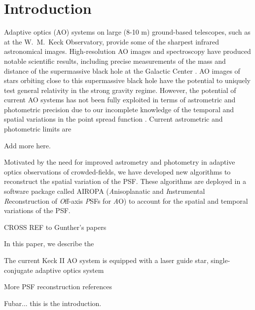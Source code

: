 \section{Introduction}

Adaptive optics (AO) systems on large (8-10 m)
ground-based telescopes, such as at the W.~M.~Keck Observatory,
provide some of the sharpest infrared astronomical images. 
High-resolution AO images and spectroscopy have produced 
notable scientific results, including precise measurements of the mass
and distance of the supermassive black hole at the Galactic Center \cite{Ghez:2008}. 
AO images of stars orbiting close to this supermassive black
hole have the potential to uniquely test general relativity in the strong
gravity regime. However, the potential of current AO systems has not been
fully exploited in terms of astrometric and photometric precision due
to our incomplete knowledge of the temporal and spatial variations in
the point spread function \cite[PSF][]{Davies:2012,Lu:2014}. 
Current astrometric and photometric limits are 
\begin{notes}
Add more here.
\end{notes}

Motivated by the need for improved astrometry and photometry in
adaptive optics observations of crowded-fields, we have developed new
algorithms to reconstruct the spatial variation of the PSF. 
These algorithms are deployed in a software package called
 AIROPA ({\it A}nisoplanatic and {\it I}nstrumental {\it
  R}econstruction of {\it O}ff-axis {\it P}SFs for {\it A}O) to
account for the spatial and temporal variations of the PSF. 
\begin{notes}
CROSS REF to Gunther's papers
\end{notes}
In this paper, we describe the 

The current Keck II AO system is equipped with a laser guide star,
single-conjugate adaptive optics system 

More PSF reconstruction references \cite{Steinbring:2005,Davies:2012,Trippe:2010}

Fubar... this is the introduction. \cite{Britton:2006}



